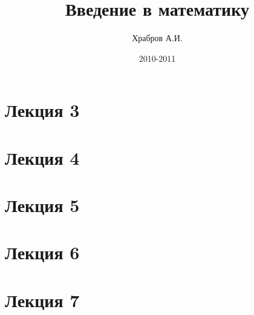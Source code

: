 \documentclass[12pt]{book}
\title{Введение в математику}
\author{Храбров А.И.}
\date{2010-2011}
\begin{document}
 

\maketitle

\tableofcontents

\chapter{ Лекция 3 }


\chapter{ Лекция 4 }


\chapter{ Лекция 5 }


\chapter{ Лекция 6 }


\chapter{ Лекция 7 }

\end{document}

